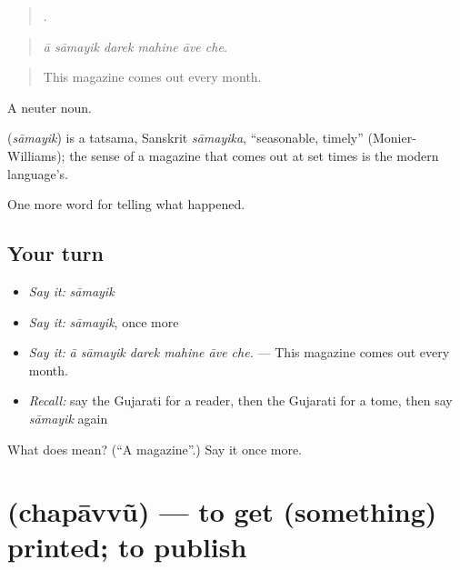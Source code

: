 \begin{quote}
     .
\end{quote}

\begin{quote}
\emph{ā sāmayik darek mahine āve che.}
\end{quote}

\begin{quote}
This magazine comes out every month.
\end{quote}

A neuter noun.

\begin{cousinweb}
\textbf{} (\emph{sāmayik}) is a tatsama, Sanskrit \emph{sāmayika}, \textquotedblleft{}seasonable, timely\textquotedblright{} (Monier-Williams); the sense of a magazine that comes out at set times is the modern language's.
\end{cousinweb}

\begin{grammarlens}[title={What you've built}]
One more word for telling what happened.
\end{grammarlens}

\subsection*{Your turn}
\begin{itemize}
\raggedright
  \item \emph{Say it:} \emph{sāmayik}
  \item \emph{Say it:} \emph{sāmayik}, once more
  \item \emph{Say it:} \emph{ā sāmayik darek mahine āve che.} — This magazine comes out every month.
  \item \emph{Recall:} say the Gujarati for a reader, then the Gujarati for a tome, then say \emph{sāmayik} again
\end{itemize}

\begin{tcolorbox}[breakable,colback=teal!4,colframe=teal!35!black,title={Before you move on}]
What does  mean? (\textquotedblleft{}A magazine\textquotedblright{}.) Say it once more.
\end{tcolorbox}
\section[\texorpdfstring{\gu{છપાવવું} (chapāvvũ)}{છપાવવું (chapāvvũ)}]{ (chapāvvũ) — to get (something) printed; to publish}

